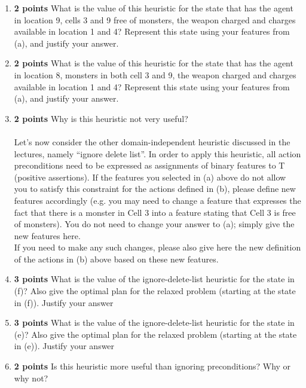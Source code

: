 \documentclass{article}
\begin{document}
\begin{enumerate}[label=(\alph*)]
    \item \textbf{2 points} What is the value of this heuristic for the state that has the agent in location 9, cells 3 and 9 free of monsters, the weapon charged and charges available in location 1 and 4? Represent this state using your features from (a), and justify your answer.
    \item \textbf{2 points} What is the value of this heuristic for the state that has the agent in location 8, monsters in both cell 3 and 9, the weapon charged and charges available in location 1 and 4? Represent this state using your features from (a), and justify your answer.
    \item \textbf{2 points} Why is this heuristic not very useful? 
    \\ \\ Let’s now consider the other domain-independent heuristic discussed in the lectures, namely “ignore delete list”. In order to apply this heuristic, all action preconditions need to be expressed as assignments of binary features to T (positive assertions). If the features you selected in (a) above do not allow you to satisfy this constraint for the actions defined in (b), please define new features accordingly (e.g. you may need to change a feature that expresses the fact that there is a monster in Cell 3 into a feature stating that Cell 3 is free of monsters). You do not need to change your answer to (a); simply give the new features here.
    \\ If you need to make any such changes, please also give here the new definition of the actions in (b) above based on these new features. \\
    \item \textbf{3 points} What is the value of the ignore-delete-list heuristic for the state in (f)? Also give the optimal plan for the relaxed problem (starting at the state in (f)). Justify your answer
    \item \textbf{3 points} What is the value of the ignore-delete-list heuristic for the state in (e)? Also give the optimal plan for the relaxed problem (starting at the state in (e)). Justify your answer
    \item \textbf{2 points} Is this heuristic more useful than ignoring preconditions? Why or why not?
\end{enumerate}

\clearpage
\end{document}
